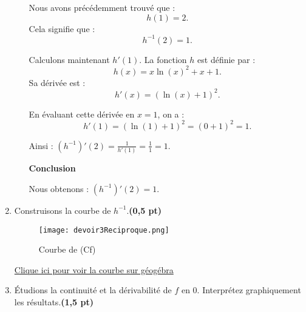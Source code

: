 \documentclass[12pt,a4paper]{article}
\begin{document}
\begin{enumerate}
\begin{enumerate}
                    Nous avons précédemment trouvé que :
                    \[
                        h(1) = 2.
                    \]
                    Cela signifie que :
                    \[
                        h^{-1}(2) = 1.
                    \]

                    Calculons maintenant \( h'(1) \). La fonction \( h \) est définie par :
                    \[
                        h(x) = x \ln(x)^2 + x + 1.
                    \]
                    Sa dérivée est :
                    \[
                        h'(x) = (\ln(x) + 1)^2.
                    \]

                    En évaluant cette dérivée en \( x = 1 \), on a :
                    \[
                        h'(1) = (\ln(1) + 1)^2 = (0 + 1)^2 = 1.
                    \]

                    Ainsi : \( (h^{-1})'(2) = \frac{1}{h'(1)} = \frac{1}{1} = 1. \)

                    \textbf{Conclusion}

                    Nous obtenons : \( (h^{-1})'(2) = 1. \)
          \end{enumerate}
    \item Construisons la courbe de \( h^{-1} \).\hfill \textbf{(0,5 pt)}
          \begin{center}
              \begin{figure}[H]%
                  \centering
                  \texttt{[image: devoir3Reciproque.png]}
                  \caption{Courbe de (Cf)}
                  \label{fig:monimage}
              \end{figure}
              \href{https://www.geogebra.org/classic/tbcc6gcm}{Clique ici pour voir la courbe sur géogébra}\\
          \end{center}
    \item Étudions la continuité et la dérivabilité de \( f \) en 0. Interprétez graphiquement les résultats.\hfill \textbf{(1,5 pt)}
\end{enumerate}
\end{document}
